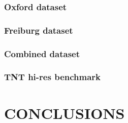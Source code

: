 \documentclass{article}
\begin{document}
\subsubsection{Oxford dataset}
\label{sssec:oxford}
\subsubsection{Freiburg dataset}
\label{sssec:freiburg}
\subsubsection{Combined dataset}
\label{sssec:combined}
\subsubsection{TNT hi-res benchmark}
\label{sssec:tnt}

\section{CONCLUSIONS}
\label{sec:concl}










\end{document}
